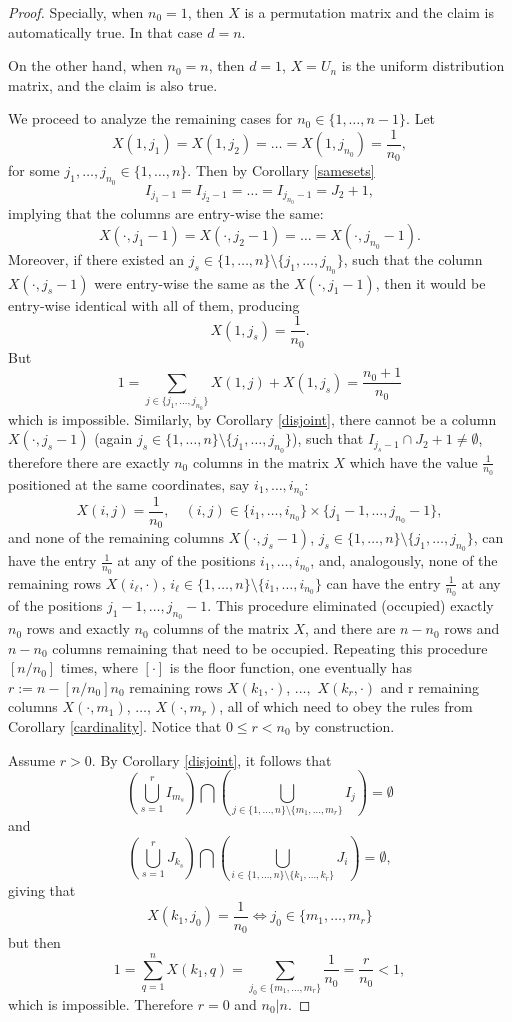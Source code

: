 \documentclass{article}
\theoremstyle{definition}\newtheorem{example}{Example}[section]
\begin{document}
	\begin{proof} Specially, when $n_0=1$, then $X$ is a permutation matrix and the claim is automatically true. 
		In that case $d=n$.
		
		
		On the other hand, when $n_0=n$, then $d=1$, $X=U_n$ is the uniform distribution matrix, and the claim is also true. 
		
		We proceed to analyze the remaining cases for $n_0\in\{1,\ldots,n-1\}$. Let $$X(1,j_1)=X(1,j_2)=\ldots=X(1,j_{n_0})=\frac{1}{n_0},$$ for some $j_1,\ldots,j_{n_0}\in\{1,\ldots,n\}$. Then by Corollary \ref{samesets}
		$$I_{j_1-1}=I_{j_2-1}=\ldots=I_{j_{n_0}-1}=J_2+1,$$
		implying that the columns are entry-wise the same:
		$$X(\cdot, j_1-1)=X(\cdot, j_2-1)=\ldots=X(\cdot,j_{n_0}-1).$$
		Moreover, if there existed an $j_s\in\{1,\ldots,n\}\setminus\{j_1,\ldots,j_{n_0}\}$, such that the column $X(\cdot, j_s-1)$ were entry-wise the same as the $X(\cdot, j_1-1)$, then it would be entry-wise identical with all of them, producing
		$$X(1,j_{s})=\frac{1}{n_0}.$$
		But
		$$1=\sum_{j\in\{j_1,\ldots,j_{n_0}\}}X(1,j)+X(1,j_s)=\frac{n_0+1}{n_0}$$
		which is impossible. Similarly, by Corollary \ref{disjoint}, there cannot be a column $X(\cdot,j_s-1)$ (again $j_s\in\{1,\ldots,n\}\setminus\{j_1,\ldots,j_{n_0}\}$), such that $I_{j_s-1}\cap J_{2}+1\neq\emptyset$, therefore 
		there are exactly $n_0$ columns in the matrix $X$ which have the value $\frac{1}{n_0}$ positioned at the same coordinates, say $i_1,\ldots,i_{n_0}$:
		$$X(i,j)=\frac{1}{n_0},\quad (i,j)\in\{i_1,\ldots,i_{n_0}\}\times\{j_1-1,\ldots,j_{n_0}-1\},$$ 
		and none of the remaining columns $X(\cdot,j_s-1)$, $j_s\in \{1,\ldots,n\}\setminus\{j_1,\ldots,j_{n_0}\}$, can have the entry $\frac{1}{n_0}$ at any of the positions $i_1,\ldots,i_{n_0}$, and, analogously, none of the remaining rows $X(i_\ell,\cdot)$, $i_\ell\in\{1,\ldots,n\}\setminus\{i_1,\ldots,i_{n_0}\}$ can have the entry $\frac{1}{n_0}$ at any of the positions $j_1-1,\ldots,j_{n_0}-1$.
		This procedure eliminated (occupied) exactly $n_0$ rows and exactly $n_0$ columns of the matrix $X$, and there are $n-n_0$ rows and $n-n_0$ columns remaining that need to be occupied. Repeating this procedure $[n/n_0]$ times, where $[\cdot]$ is the floor function, one eventually has $r:=n-[n/n_0]n_0$ remaining rows $X(k_1,\cdot)$, $\ldots,$ $X(k_r,\cdot)$ and r remaining columns $X(\cdot, m_1)$, $\ldots$, $X(\cdot, m_r)$,  all of which need to obey the rules from Corollary \ref{cardinality}. Notice that $0\leq r<n_0$ by construction. 
		
		Assume $r>0$. By Corollary \ref{disjoint}, it follows that 
		$$\left(\bigcup_{s=1}^rI_{m_s}\right)\bigcap\left(\bigcup_{j\in\{1,\ldots,n\}\setminus\{m_1,\ldots,m_r\}} I_{j}\right)=\emptyset$$
		and
		$$\left(\bigcup_{s=1}^rJ_{k_s}\right)\bigcap\left(\bigcup_{i\in\{1,\ldots,n\}\setminus\{k_1,\ldots,k_r\}} J_i\right)=\emptyset,$$
		giving that
		$$X(k_1,j_0)=\frac{1}{n_0}\Leftrightarrow j_0\in\{m_1,\ldots,m_r\}$$
		but then 
		$$1=\sum_{q=1}^n X(k_1,q)=\sum_{j_0\in\{m_1,\ldots,m_r\}}\frac{1}{n_0}=\frac{r}{n_0}<1,$$
		which is impossible. Therefore $r=0$ and $n_0|n$.
	\end{proof}
	
\end{document}
